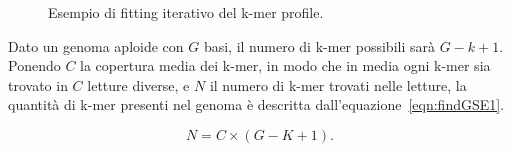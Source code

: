\documentclass[crop=false, class=book]{standalone}
\begin{document}
	\begin{figure}[h]
		\centering
		 \quad
		 \quad
		\caption{Esempio di fitting iterativo del k-mer profile.}
		\label{fig:findGSEfitting}
	\end{figure}

	Dato un genoma aploide con $G$ basi, il numero di k-mer possibili sarà $G-k+1$. Ponendo $C$ la copertura media dei k-mer, in modo che in media ogni k-mer sia trovato in $C$ letture diverse, e $N$ il numero di k-mer trovati nelle letture, la quantità di k-mer presenti nel genoma è descritta dall'equazione~\vref{eqn:findGSE1}. 	
	
	\begin{equation}
		\label{eqn:findGSE1}
		N=C \times (G-K+1).
	\end{equation}
		
\end{document}
